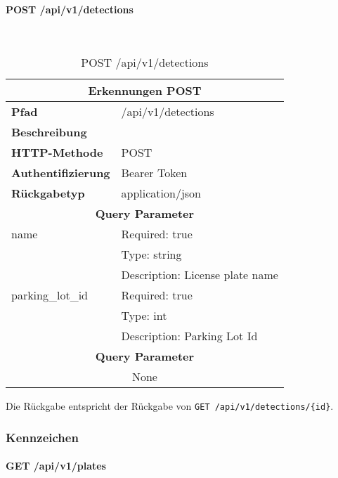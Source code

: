\paragraph{POST /api/v1/detections}\mbox{}\\

\begin{table}[H]
  \centering
  \begin{tabular}{|l|l|}
  \hline
  \multicolumn{2}{|c|}{\textbf{Erkennungen POST}}          \\ \hline
  \textbf{Pfad}              & /api/v1/detections              \\ \hline
  \textbf{Beschreibung}      &                                 \\ \hline
  \textbf{HTTP-Methode}      & POST                            \\ \hline
  \textbf{Authentifizierung} & Bearer Token                    \\ \hline
  \textbf{Rückgabetyp}       & application/json                \\ \hline
  \multicolumn{2}{|c|}{\textbf{Query Parameter}}               \\ \hline
  name                       & Required: true                  \\ \hline
                             & Type: string                    \\ \hline
                             & Description: License plate name \\ \hline
  parking\_lot\_id           & Required: true                  \\ \hline
                             & Type: int                       \\ \hline
                             & Description: Parking Lot Id     \\ \hline
  \multicolumn{2}{|c|}{\textbf{Query Parameter}}                      \\ \hline
  \multicolumn{2}{|c|}{None}          \\ \hline
  \end{tabular}
  \caption{POST /api/v1/detections}
\end{table}

Die Rückgabe entspricht der Rückgabe von \verb|GET /api/v1/detections/{id}|.

\subsubsection{Kennzeichen}
\paragraph{GET /api/v1/plates}\mbox{}\\

